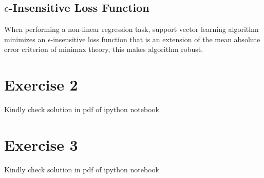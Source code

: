 \documentclass[12pt]{article}
\begin{document}
\subsection{$\epsilon$-Insensitive Loss Function}

When performing a non-linear regression task, support vector learning algorithm minimizes an $\epsilon$-insensitive loss function that is an extension of the mean absolute error criterion of minimax theory, this makes algorithm robust.

\section{Exercise 2}

Kindly check solution in pdf of ipython notebook
\section{Exercise 3}

Kindly check solution in pdf of ipython notebook
\end{document}
